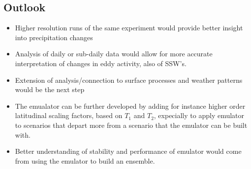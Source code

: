 \subsection{Outlook}
\begin{itemize}
    \item Higher resolution runs of the same experiment would provide better insight into precipitation changes
    \item Analysis of daily or sub-daily data would allow for more accurate interpretation of changes in eddy activity, also of SSW's.
    \item Extension of analysis/connection to surface processes and weather patterns would be the next step
    \item The emualator can be further developed by adding for instance higher order latitudinal scaling factors, based on $T_1$ and $T_2$, expecially to apply emulator to scenarios that depart more from a scenario that the emulator can be built with.
    \item Better understanding of stability and performance of emulator would come from using the emulator to build an ensemble. 
\end{itemize}
